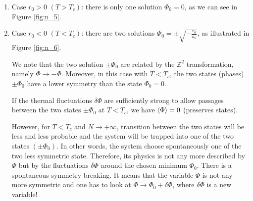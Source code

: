 \documentclass[../main/main.tex]{subfiles}
\begin{document}
\begin{enumerate}
\item Case \( r_0>0 \) \( (T>T_c) \): there is only one solution \( \Phi _0 =0 \), as we can see in Figure \ref{fig:n_5}.

\item Case \( r_0<0 \) \( (T<T_c) \): there are two solutions \( \Phi _0 = \pm \sqrt{-\frac{r_0}{u_0}}  \), as illustrated in Figure \ref{fig:n_6}.

We note that the two solution \( \pm \Phi _0 \) are related by the \( \mathbb{Z}^2 \) transformation, namely \( \Phi \rightarrow - \Phi  \).
Moreover, in this case with \( T < T_c \), the two states (phases) \( \pm \Phi _0 \) have a lower symmetry than the state \( \Phi _0 = 0 \).

If the thermal fluctuations \( \delta \Phi  \) are sufficiently strong to allow passages between the two states \( \pm \Phi _0 \) at \( T < T_c \), we have \( \expval{\Phi } = 0  \) (preserves states).


However, for \( T < T_c \) and \( N \rightarrow + \infty  \), transition between the two states will be less and less probable and the system will be trapped into one of the two states \( (\pm \Phi _0) \). In other words, the system choose spontaneously one of the two less symmetric state. Therefore, its physics is not any more described by \( \Phi  \) but by the fluctuations \( \delta \Phi  \) around the chosen minimum \( \Phi _0 \). There is a spontaneous symmetry breaking. It means that the variable \( \Phi  \) is not any more symmetric and one has to look at \( \Phi \rightarrow \Phi _0 + \delta \Phi  \), where \( \delta \Phi  \) is a new variable!

\end{enumerate}
\end{document}

